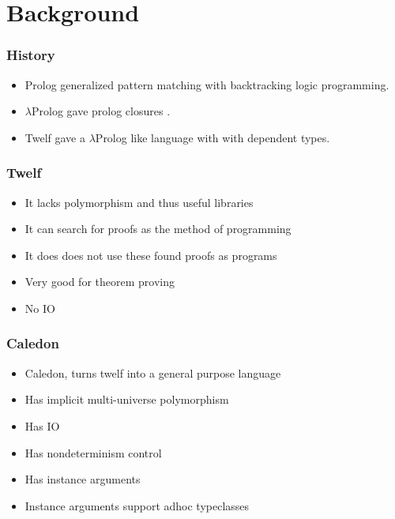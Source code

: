 \section[Background]{Background}

\begin{frame}
\frametitle{History}

\begin{itemize}
\item Prolog generalized pattern matching with backtracking logic programming.
\item $\lambda$Prolog gave prolog closures \citep{miller1988overview}.
\item Twelf \citep{pfenning1999system} gave a $\lambda$Prolog like language with with dependent types.
\end{itemize}
\end{frame}


\begin{frame}
\frametitle{Twelf}
\begin{itemize}
\item It lacks polymorphism and thus useful libraries
\item It can search for proofs as the method of programming 
\item It does does not use these found proofs as programs
\item Very good for theorem proving
\item No IO
\end{itemize}

\end{frame}


\begin{frame}

\frametitle{Caledon}
\begin{itemize}
\item Caledon, turns twelf into a general purpose language
\item Has implicit multi-universe polymorphism
\item Has IO
\item Has nondeterminism control
\item Has instance arguments
\item Instance arguments support adhoc typeclasses
\end{itemize}
\end{frame}

